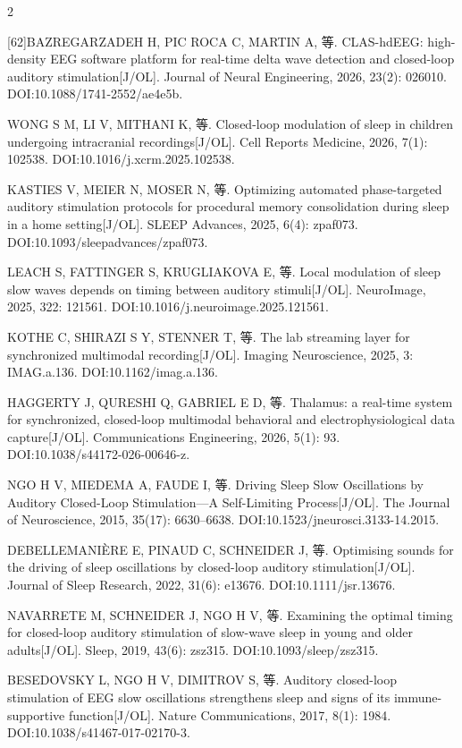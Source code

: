 \documentclass[UTF8,zihao=5,fontset=none]{ctexart}
\begin{document}
\begin{multicols}{2}
{[62]\quad BAZREGARZADEH H, PIC ROCA C, MARTIN A, 等. CLAS-hdEEG: high-density EEG software platform for real-time delta wave detection and closed-loop auditory stimulation[J/OL]. Journal of Neural Engineering, 2026, 23(2): 026010. DOI:10.1088/1741-2552/ae4e5b.\par
[63]\quad WONG S M, LI V, MITHANI K, 等. Closed-loop modulation of sleep in children undergoing intracranial recordings[J/OL]. Cell Reports Medicine, 2026, 7(1): 102538. DOI:10.1016/j.xcrm.2025.102538.\par
[64]\quad KASTIES V, MEIER N, MOSER N, 等. Optimizing automated phase-targeted auditory stimulation protocols for procedural memory consolidation during sleep in a home setting[J/OL]. SLEEP Advances, 2025, 6(4): zpaf073. DOI:10.1093/sleepadvances/zpaf073.\par
[65]\quad LEACH S, FATTINGER S, KRUGLIAKOVA E, 等. Local modulation of sleep slow waves depends on timing between auditory stimuli[J/OL]. NeuroImage, 2025, 322: 121561. DOI:10.1016/j.neuroimage.2025.121561.\par
[66]\quad KOTHE C, SHIRAZI S Y, STENNER T, 等. The lab streaming layer for synchronized multimodal recording[J/OL]. Imaging Neuroscience, 2025, 3: IMAG.a.136. DOI:10.1162/imag.a.136.\par
[67]\quad HAGGERTY J, QURESHI Q, GABRIEL E D, 等. Thalamus: a real-time system for synchronized, closed-loop multimodal behavioral and electrophysiological data capture[J/OL]. Communications Engineering, 2026, 5(1): 93. DOI:10.1038/s44172-026-00646-z.\par
[68]\quad NGO H V, MIEDEMA A, FAUDE I, 等. Driving Sleep Slow Oscillations by Auditory Closed-Loop Stimulation—A Self-Limiting Process[J/OL]. The Journal of Neuroscience, 2015, 35(17): 6630--6638. DOI:10.1523/jneurosci.3133-14.2015.\par
[69]\quad DEBELLEMANIÈRE E, PINAUD C, SCHNEIDER J, 等. Optimising sounds for the driving of sleep oscillations by closed-loop auditory stimulation[J/OL]. Journal of Sleep Research, 2022, 31(6): e13676. DOI:10.1111/jsr.13676.\par
[70]\quad NAVARRETE M, SCHNEIDER J, NGO H V, 等. Examining the optimal timing for closed-loop auditory stimulation of slow-wave sleep in young and older adults[J/OL]. Sleep, 2019, 43(6): zsz315. DOI:10.1093/sleep/zsz315.\par
[71]\quad BESEDOVSKY L, NGO H V, DIMITROV S, 等. Auditory closed-loop stimulation of EEG slow oscillations strengthens sleep and signs of its immune-supportive function[J/OL]. Nature Communications, 2017, 8(1): 1984. DOI:10.1038/s41467-017-02170-3.\par
}
\end{multicols}
\end{document}
